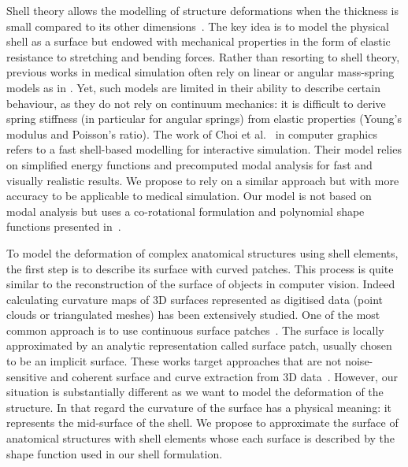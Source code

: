 \documentclass{llncs}
\begin{document}
Shell theory allows the modelling of structure deformations when the thickness is small compared to its other dimensions~\cite{Liu03}. The key idea is to model the physical shell as a surface but endowed with mechanical properties in the form of elastic resistance to stretching and bending forces. Rather than resorting to shell theory, previous works in medical simulation often rely on linear or angular mass-spring models as in \cite{Nedel98,Hammer08}. Yet, such models are limited in their ability to describe certain behaviour, as they do not rely on continuum mechanics: it is difficult to derive spring stiffness (in particular for angular springs) from elastic properties (Young's modulus and Poisson's ratio).
The work of Choi et al.~\cite{Choi07} in computer graphics refers to a fast shell-based modelling for interactive simulation. Their model relies on simplified energy functions and precomputed modal analysis for fast and visually realistic results. We propose to rely on a similar approach but with more accuracy to be applicable to medical simulation. Our model is not based on modal analysis but uses a co-rotational formulation and polynomial shape functions presented in~\cite{Comas10}. 

To model the deformation of complex anatomical structures using shell elements, the first step is to describe its surface with curved patches. This process is quite similar to the reconstruction of the surface of objects in computer vision. Indeed calculating curvature maps of 3D surfaces represented as digitised data (point clouds or triangulated meshes) has been extensively studied. One of the most common approach is to use continuous surface patches~\cite{Kolb95}. The surface is locally approximated by an analytic representation called surface patch, usually chosen to be an implicit surface. These works target approaches that are not noise-sensitive and coherent surface and curve extraction from 3D data~\cite{Tang99}. 
However, our situation is substantially different as we want to model the deformation of the structure. In that regard the curvature of the surface has a physical meaning: it represents the mid-surface of the shell. 
We propose to approximate the surface of anatomical structures with shell elements whose each surface is described by the shape function used in our shell formulation.
\end{document}
